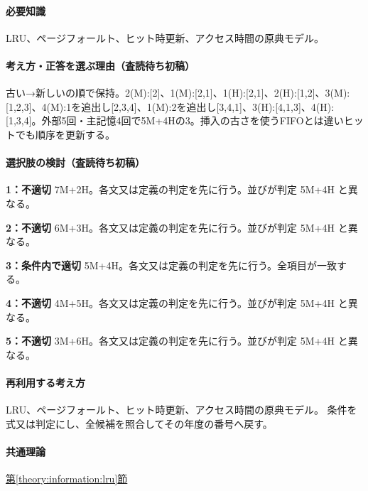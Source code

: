 \paragraph{必要知識} LRU、ページフォールト、ヒット時更新、アクセス時間の原典モデル。

\paragraph{考え方・正答を選ぶ理由（査読待ち初稿）} 古い→新しいの順で保持。2(M):[2]、1(M):[2,1]、1(H):[2,1]、2(H):[1,2]、3(M):[1,2,3]、4(M):1を追出し[2,3,4]、1(M):2を追出し[3,4,1]、3(H):[4,1,3]、4(H):[1,3,4]。外部5回・主記憶4回で5M+4Hの3。挿入の古さを使うFIFOとは違いヒットでも順序を更新する。

\paragraph{選択肢の検討（査読待ち初稿）}\mbox{}\par

\noindent\textbf{1：不適切} 7M+2H。各文又は定義の判定を先に行う。並びが判定 5M+4H と異なる。\par

\noindent\textbf{2：不適切} 6M+3H。各文又は定義の判定を先に行う。並びが判定 5M+4H と異なる。\par

\noindent\textbf{3：条件内で適切} 5M+4H。各文又は定義の判定を先に行う。全項目が一致する。\par

\noindent\textbf{4：不適切} 4M+5H。各文又は定義の判定を先に行う。並びが判定 5M+4H と異なる。\par

\noindent\textbf{5：不適切} 3M+6H。各文又は定義の判定を先に行う。並びが判定 5M+4H と異なる。\par

\paragraph{再利用する考え方} LRU、ページフォールト、ヒット時更新、アクセス時間の原典モデル。 条件を式又は判定にし、全候補を照合してその年度の番号へ戻す。

\paragraph{共通理論} \hyperref[theory:information:lru]{第\ref*{theory:information:lru}節}

